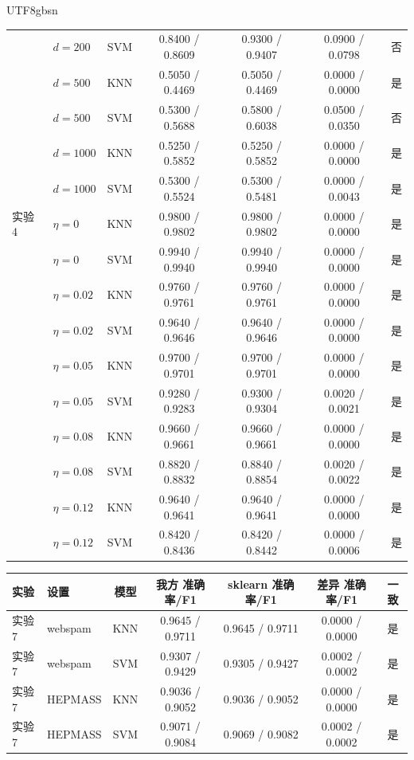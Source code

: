 \documentclass{article}
\begin{document}
\begin{CJK}{UTF8}{gbsn}
{\begin{longtable}{@{}llccccc@{}}
 & $d=200$ & SVM & 0.8400 / 0.8609 & 0.9300 / 0.9407 & 0.0900 / 0.0798 & 否 \\
 & $d=500$ & KNN & 0.5050 / 0.4469 & 0.5050 / 0.4469 & 0.0000 / 0.0000 & 是 \\
 & $d=500$ & SVM & 0.5300 / 0.5688 & 0.5800 / 0.6038 & 0.0500 / 0.0350 & 否 \\
 & $d=1000$ & KNN & 0.5250 / 0.5852 & 0.5250 / 0.5852 & 0.0000 / 0.0000 & 是 \\
 & $d=1000$ & SVM & 0.5300 / 0.5524 & 0.5300 / 0.5481 & 0.0000 / 0.0043 & 是 \\
实验 4 & $\eta=0$ & KNN & 0.9800 / 0.9802 & 0.9800 / 0.9802 & 0.0000 / 0.0000 & 是 \\
 & $\eta=0$ & SVM & 0.9940 / 0.9940 & 0.9940 / 0.9940 & 0.0000 / 0.0000 & 是 \\
 & $\eta=0.02$ & KNN & 0.9760 / 0.9761 & 0.9760 / 0.9761 & 0.0000 / 0.0000 & 是 \\
 & $\eta=0.02$ & SVM & 0.9640 / 0.9646 & 0.9640 / 0.9646 & 0.0000 / 0.0000 & 是 \\
 & $\eta=0.05$ & KNN & 0.9700 / 0.9701 & 0.9700 / 0.9701 & 0.0000 / 0.0000 & 是 \\
 & $\eta=0.05$ & SVM & 0.9280 / 0.9283 & 0.9300 / 0.9304 & 0.0020 / 0.0021 & 是 \\
 & $\eta=0.08$ & KNN & 0.9660 / 0.9661 & 0.9660 / 0.9661 & 0.0000 / 0.0000 & 是 \\
 & $\eta=0.08$ & SVM & 0.8820 / 0.8832 & 0.8840 / 0.8854 & 0.0020 / 0.0022 & 是 \\
 & $\eta=0.12$ & KNN & 0.9640 / 0.9641 & 0.9640 / 0.9641 & 0.0000 / 0.0000 & 是 \\
 & $\eta=0.12$ & SVM & 0.8420 / 0.8436 & 0.8420 / 0.8442 & 0.0000 / 0.0006 & 是 \\
\end{longtable}
}

\begin{minipage}{\linewidth}
\centering
{}
\label{tab:verify_real}
\normalsize
\setlength{\tabcolsep}{3.5pt}
\begin{tabular}{@{}llccccc@{}}
\toprule
实验 & 设置 & 模型 & 我方 准确率/F1 & sklearn 准确率/F1 & 差异 准确率/F1 & 一致 \\
\midrule
实验 7 & webspam & KNN & 0.9645 / 0.9711 & 0.9645 / 0.9711 & 0.0000 / 0.0000 & 是 \\
实验 7 & webspam & SVM & 0.9307 / 0.9429 & 0.9305 / 0.9427 & 0.0002 / 0.0002 & 是 \\
实验 7 & HEPMASS & KNN & 0.9036 / 0.9052 & 0.9036 / 0.9052 & 0.0000 / 0.0000 & 是 \\
实验 7 & HEPMASS & SVM & 0.9071 / 0.9084 & 0.9069 / 0.9082 & 0.0002 / 0.0002 & 是 \\
\bottomrule
\end{tabular}
\end{minipage}


\end{CJK}
\end{document}
